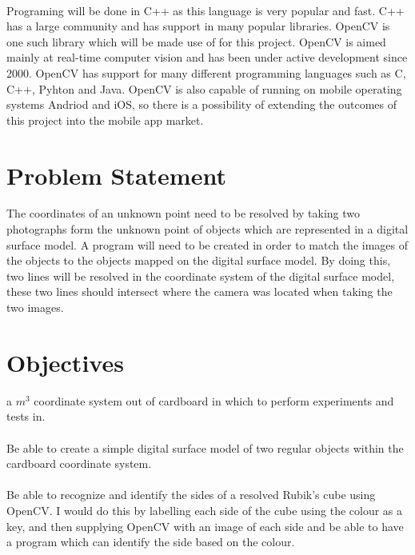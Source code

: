 \documentclass{article}
\begin{document}
\paragraph{}
Programing will be done in C++ as this language is very popular and fast. C++ has a large community and has support in many popular libraries. OpenCV is one such library which will be made use of for this project. OpenCV is aimed mainly at real-time computer vision and has been under active development since 2000. OpenCV has support for many different programming languages such as C, C++, Pyhton and Java. OpenCV is also capable of running on mobile operating systems Andriod and iOS, so there is a possibility of extending the outcomes of this project into the mobile app market.

\section{Problem Statement}
The coordinates of an unknown point need to be resolved by taking two photographs form the unknown point of objects which are represented in a digital surface model. A program will need to be created in order to match the images of the objects to the objects mapped on the digital surface model. By doing this, two lines will be resolved in the coordinate system of the digital surface model, these two lines should intersect where the camera was located when taking the two images.

\section{Objectives}

\Create a $m^3$ coordinate system out of cardboard in which to perform experiments and tests in.

\paragraph{}
Be able to create a simple digital surface model of two regular objects within the cardboard coordinate system.

\paragraph{}
Be able to recognize and identify the sides of a resolved Rubik's cube using OpenCV. I would do this by labelling each side of the cube using the colour as a key, and then supplying OpenCV with an image of each side and be able to have a program which can identify the side based on the colour.
\end{document}
